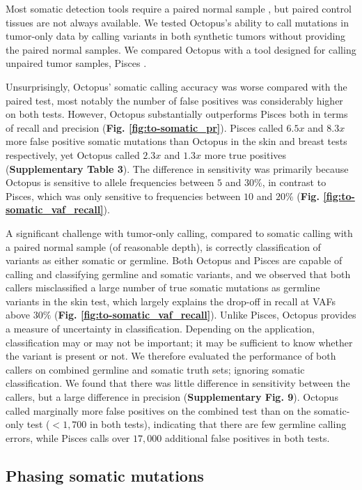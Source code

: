 \documentclass[notitlepage, twocolumn, 10pt]{article}
\begin{document}
Most somatic detection tools require a paired normal sample \cite{RN604, RN601, RN600}, but paired control tissues are not always available. We tested Octopus's ability to call mutations in tumor-only data by calling variants in both synthetic tumors without providing the paired normal samples. We compared Octopus with a tool designed for calling unpaired tumor samples, Pisces \cite{RN602}.

Unsurprisingly, Octopus' somatic calling accuracy was worse compared with the paired test, most notably the number of false positives was considerably higher on both tests. However, Octopus substantially outperforms Pisces both in terms of recall and precision (\textbf{Fig. \ref{fig:to-somatic_pr}}). Pisces called $6.5x$ and $8.3x$ more false positive somatic mutations than Octopus in the skin and breast tests respectively, yet Octopus called $2.3x$ and $1.3x$ more true positives (\textbf{Supplementary Table 3}). The difference in sensitivity was primarily because Octopus is sensitive to allele frequencies between $5$ and $30\%$, in contrast to Pisces, which was only sensitive to frequencies between $10$ and $20\%$ (\textbf{Fig. \ref{fig:to-somatic_vaf_recall}}).

A significant challenge with tumor-only calling, compared to somatic calling with a paired normal sample (of reasonable depth), is correctly classification of variants as either somatic or germline. Both Octopus and Pisces are capable of calling and classifying germline and somatic variants, and we observed that both callers misclassified a large number of true somatic mutations as germline variants in the skin test, which largely explains the drop-off in recall at VAFs above $30\%$ (\textbf{Fig. \ref{fig:to-somatic_vaf_recall}}). Unlike Pisces, Octopus provides a measure of uncertainty in classification. Depending on the application, classification may or may not be important; it may be sufficient to know whether the variant is present or not. We therefore evaluated the performance of both callers on combined germline and somatic truth sets; ignoring somatic classification. We found that there was little difference in sensitivity between the callers, but a large difference in precision (\textbf{Supplementary Fig. 9}). Octopus called marginally more false positives on the combined test than on the somatic-only test ($<1,700$ in both tests), indicating that there are few germline calling errors, while Pisces calls over $17,000$ additional false positives in both tests.

\subsection*{Phasing somatic mutations}
\end{document}
